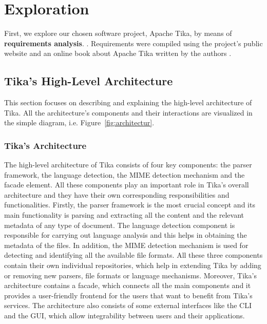 \documentclass{article}
\begin{document}
\section{Exploration}
First, we explore our chosen software project, Apache Tika, by means of \textbf{requirements analysis}. \citep{dresner1964maintenance}. Requirements were compiled using the project's public website \citep{apache_software_foundation_2020} and an online book about Apache Tika written by the authors \citep{tika_in_action}. 
\subsection{Tika's High-Level Architecture}
This section focuses on describing and explaining the high-level architecture of Tika. All the architecture’s components and their interactions are visualized in the simple diagram, i.e. Figure~\ref{fig:architectur}.
\subsubsection{Tika's Architecture}
The high-level architecture of Tika consists of four key components: the parser framework, the language detection, the MIME detection mechanism and the facade element. All these components play an important role in Tika’s overall architecture and they have their own corresponding responsibilities and functionalities. Firstly, the parser framework is the most crucial concept and its main functionality is parsing and extracting all the content and the relevant metadata of any type of document. The language detection component is responsible for carrying out language analysis and this helps in obtaining the metadata of the files. In addition, the MIME detection mechanism is used for detecting and identifying all the available file formats. All these three components contain their own individual repositories, which help in extending Tika by adding or removing new parsers, file formats or language mechanisms. Moreover, Tika’s architecture contains a facade, which connects all the main components and it provides a user-friendly frontend for the users that want to benefit from Tika’s services. The architecture also consists of some external interfaces like the CLI and the GUI, which allow integrability between users and their applications.
\end{document}
